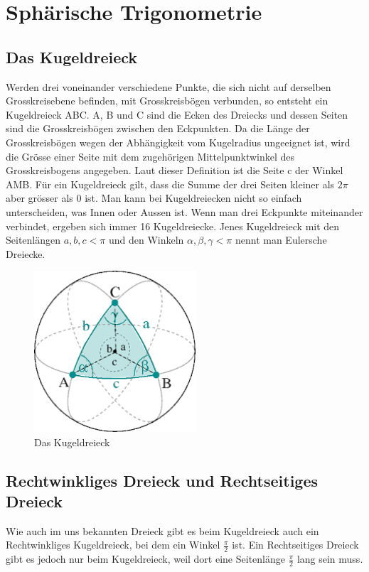 \section{Sphärische Trigonometrie}
\subsection{Das Kugeldreieck}

Werden drei voneinander verschiedene Punkte, die sich nicht auf derselben Grosskreisebene befinden, mit Grosskreisbögen verbunden, so entsteht ein Kugeldreieck ABC.
A, B und C sind die Ecken des Dreiecks und dessen Seiten sind die Grosskreisbögen zwischen den Eckpunkten. 
Da die Länge der Grosskreisbögen wegen der Abhängigkeit vom Kugelradius ungeeignet ist, wird die Grösse einer Seite mit dem zugehörigen Mittelpunktwinkel des Grosskreisbogens angegeben. 
Laut dieser Definition ist die Seite c der Winkel AMB. 
Für ein Kugeldreieck gilt, dass die Summe der drei Seiten kleiner als $2\pi$ aber grösser als 0 ist. 
Man kann bei Kugeldreiecken nicht so einfach unterscheiden, was Innen oder Aussen ist. 
Wenn man drei Eckpunkte miteinander verbindet, ergeben sich immer 16 Kugeldreiecke. 
Jenes Kugeldreieck mit den Seitenlängen $a, b, c < \pi$ und den Winkeln $\alpha, \beta, \gamma < \pi$ nennt man Eulersche Dreiecke.
\begin{figure}[h]
	\begin{center}
		\includegraphics[width=6cm]{papers/nav/bilder/kugel1.png}
		\caption[Das Kugeldreieck]{Das Kugeldreieck}
	\end{center}
	
\end{figure}

\subsection{Rechtwinkliges Dreieck und Rechtseitiges Dreieck}
Wie auch im uns bekannten Dreieck gibt es beim Kugeldreieck auch ein Rechtwinkliges Kugeldreieck, bei dem ein Winkel $\frac{\pi}{2}$ ist. 
Ein Rechtseitiges Dreieck gibt es jedoch nur beim Kugeldreieck, weil dort eine Seitenlänge $\frac{\pi}{2}$ lang sein muss.
\newpage
